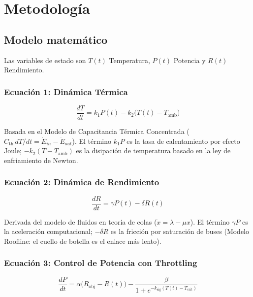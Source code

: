 \documentclass[10pt, twocolumn]{article}
\begin{document}
\section{Metodología}
\label{sec:metodologia}

\subsection{Modelo matemático}

Las variables de estado son $T(t)$ Temperatura, $P(t)$ Potencia y $R(t)$ Rendimiento.

\subsubsection*{Ecuación 1: Dinámica Térmica}

\begin{equation}
  \frac{dT}{dt} = k_1 P(t) - k_2\bigl(T(t) - T_{\text{amb}}\bigr)
  \label{eq:termica}
\end{equation}

Basada en el Modelo de Capacitancia Térmica Concentrada
($C_{\text{th}}\,dT/dt = \dot{E}_{in} - \dot{E}_{out}$). El término
$k_1 P$ es la tasa de calentamiento por efecto Joule; $-k_2(T-T_\text{amb})$
es la disipación de temperatura basado en la ley de enfriamiento de Newton.~\cite{incropera}

\subsubsection*{Ecuación 2: Dinámica de Rendimiento}

\begin{equation}
  \frac{dR}{dt} = \gamma P(t) - \delta R(t)
  \label{eq:rendimiento}
\end{equation}

Derivada del modelo de fluidos en teoría de colas
($\dot{x} = \lambda - \mu x$). El término $\gamma P$ es la aceleración
computacional; $-\delta R$ es la fricción por saturación de buses
(Modelo Roofline: el cuello de botella es el enlace más lento).~\cite{kleinrock,williams}

\subsubsection*{Ecuación 3: Control de Potencia con Throttling}

\begin{equation}
  \frac{dP}{dt} = \alpha\bigl(R_{\text{obj}} - R(t)\bigr)
                 - \frac{\beta}{1 + e^{-k_{\text{sig}}(T(t) - T_{\text{crit}})}}
  \label{eq:potencia}
\end{equation}
\end{document}
